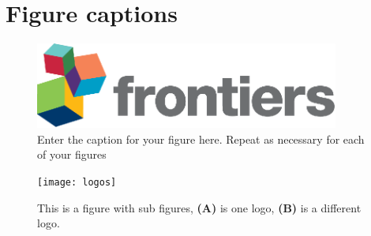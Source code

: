 \documentclass[utf8]{FrontiersinHarvard} %
\begin{document}



\section*{Figure captions}


\begin{figure}[h!]
\begin{center}
\includegraphics[width=10cm]{logo1}%
\end{center}
\caption{ Enter the caption for your figure here.  Repeat as  necessary for each of your figures}\label{fig:1}
\end{figure}


\begin{figure}[h!]
\begin{center}
\texttt{[image: logos]}
\end{center}
\caption{This is a figure with sub figures, \textbf{(A)} is one logo, \textbf{(B)} is a different logo.}\label{fig:2}
\end{figure}
\end{document}
